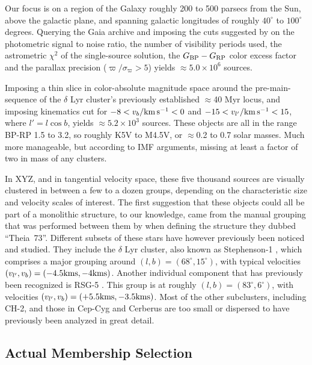 \documentclass[12pt,twocolumn,linenumbers]{aastex63}
\begin{document}
Our focus is on a region of the Galaxy roughly 200 to 500 parsecs from
the Sun, above the galactic plane, and spanning galactic longitudes of
roughly $40^\circ$ to $100^\circ$ degrees.  Querying the Gaia archive
and imposing the cuts suggested by \citet[][Appendix
B]{GaiaCollaboration2018} on the photometric signal to noise ratio,
the number of visibility periods used, the astrometric $\chi^2$ of the
single-source solution, the $G_{\rm BP}-G_{\rm RP}$ color excess
factor and the parallax precision ($\varpi/\sigma_\varpi>5$) yields
$\approx5.0\times10^6$ sources.

Imposing a thin slice in color-absolute magnitude space around the
pre-main-sequence of the $\delta$ Lyr cluster's previously established
$\approx$40 Myr locus, and imposing kinematics cut for $-8 < v_b /
{\rm km\,s^{-1}} < 0$ and $-15 < v_{l'} / {\rm km\,s^{-1}} < 15$,
where $l'=l\cos b$, yields $\approx 5.2\times10^3$ sources.  These
objects are all in the range BP-RP 1.5 to 3.2, so roughly K5V to
M4.5V, or $\approx$0.2 to 0.7 solar masses.  Much more manageable, but
according to IMF arguments, missing at least a factor of two in mass
of any clusters.

In XYZ, and in tangential velocity space, these five thousand sources
are visually clustered in between a few to a dozen groups, depending
on the characteristic size and velocity scales of interest.  The first
suggestion that these objects could all be part of a monolithic
structure, to our knowledge, came from the manual grouping that was
performed between them by \citet{KounkelCovey2019} when defining the
structure they dubbed ``Theia~73''.  Different subsets of these stars
have however previously been noticed and studied.  They include the
$\delta$ Lyr cluster, also known as Stephenson-1
\citep{stephenson_possible_1959}, which comprises a major grouping
around $(l,b)=(68^\circ,15^\circ)$, with typical velocities $(v_{l'},
v_b)=(-4.5{\rm kms},-4{\rm kms})$.  Another individual component
that has previously been recognized is RSG-5 \citep{roser_nine_2016}.
This group is at roughly $(l,b)=(83^\circ,6^\circ)$, with velocities
$(v_{l'}, v_b)=(+5.5{\rm kms},-3.5{\rm kms})$.  Most of the other
subclusters, including CH-2, and those in Cep-Cyg and Cerberus are too
small or dispersed to have previously been analyzed in great detail.

\subsection{Actual Membership Selection} %
\end{document}
